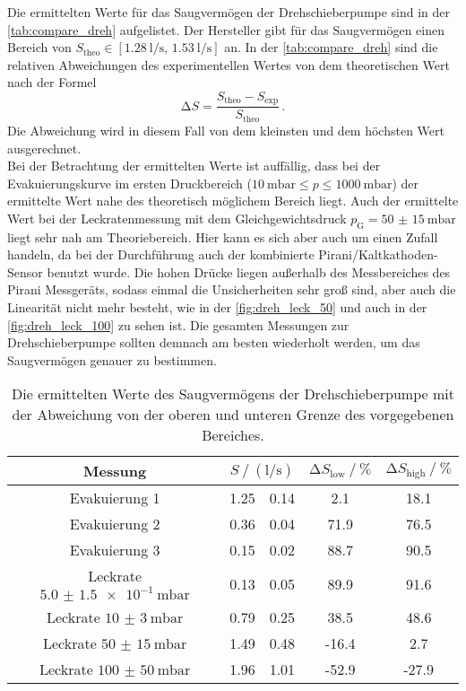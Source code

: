 \noindent Die ermittelten Werte für das Saugvermögen der Drehschieberpumpe sind in der \autoref{tab:compare_dreh} aufgelistet. Der Hersteller gibt für das Saugvermögen einen Bereich 
von $ S_\text{theo} \in [\SI{1.28}{\litre\per\second},\, \SI{1.53}{\litre\per\second}]$ an. In der \autoref{tab:compare_dreh} sind die relativen Abweichungen des experimentellen Wertes von 
dem theoretischen Wert nach der Formel 
\begin{equation}
    \increment S = \frac{S_\text{theo} - S_\text{exp}}{S_\text{theo}}\, .
    \label{eqn:rel_abw}
\end{equation}
Die Abweichung wird in diesem Fall von dem kleinsten und dem höchsten Wert ausgerechnet. \\
Bei der Betrachtung der ermittelten Werte ist auffällig, dass bei der Evakuierungskurve im ersten Druckbereich ($\SI{10}{\milli\bar} \leq p \leq \SI{1000}{\milli\bar}$) der ermittelte 
Wert nahe des theoretisch möglichem Bereich liegt. Auch der ermittelte Wert bei der Leckratenmessung mit dem Gleichgewichtsdruck $p_\text{G} = \SI{50(15)}{\milli\bar}$ liegt sehr nah am Theoriebereich. 
Hier kann es sich aber auch um einen Zufall handeln, da bei der Durchführung auch der kombinierte Pirani/Kaltkathoden-Sensor benutzt wurde. Die hohen Drücke liegen außerhalb des Messbereiches des Pirani Messgeräts, 
sodass einmal die Unsicherheiten sehr groß sind, aber auch die Linearität nicht mehr besteht, wie in der \autoref{fig:dreh_leck_50} und auch in der \autoref{fig:dreh_leck_100} zu sehen ist. 
Die gesamten Messungen zur Drehschieberpumpe sollten demnach am besten wiederholt werden, um das Saugvermögen genauer zu bestimmen. 

\begin{table}
    \centering
    \caption{Die ermittelten Werte des Saugvermögens der Drehschieberpumpe mit der Abweichung von der oberen und unteren Grenze des vorgegebenen Bereiches.}
    \label{tab:compare_dreh}
    \begin{tabular}{c  S @{${}\pm{}$} S  S[table-format=2.1] S[table-format=3.1]}
        \toprule
        {Messung} &  & {$\increment S_\text{low} \mathbin{/} \si{\percent}$} & {$\increment S_\text{high} \mathbin{/} \si{\percent}$} \\ 
        \midrule
        Evakuierung 1                       & 1.25 & 0.14 &  2.1 &  18.1\\
        Evakuierung 2                       & 0.36 & 0.04 & 71.9 &  76.5\\
        Evakuierung 3                       & 0.15 & 0.02 & 88.7 &  90.5\\
        Leckrate $\SI{5.0(15)e-1}{\milli\bar}$ & 0.13 & 0.05 & 89.9 &  91.6\\
        Leckrate $\SI{10(3)}{\milli\bar}$   & 0.79 & 0.25 & 38.5 &  48.6\\
        Leckrate $\SI{50(15)}{\milli\bar}$  & 1.49 & 0.48 &-16.4 &   2.7\\
        Leckrate $\SI{100(50)}{\milli\bar}$ & 1.96 & 1.01 &-52.9 & -27.9\\
        \bottomrule
    \end{tabular}
\end{table}

